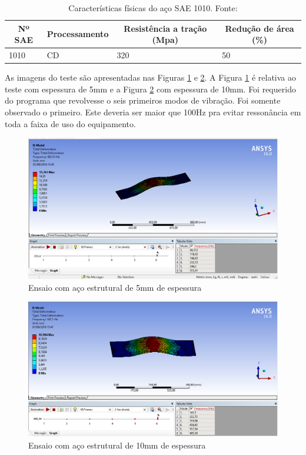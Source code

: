 \begin{table}[!h]
\centering
\caption{Características físicas do aço SAE 1010. Fonte: \cite{shigley}}
\label{tab:caracteristicas_aco}
\begin{tabular}{|l|l|l|l|}
\hline
\multicolumn{1}{|c|}{\textbf{Nº SAE}} & \multicolumn{1}{c|}{\textbf{Processamento}} & \multicolumn{1}{c|}{\textbf{Resistência a tração (Mpa)}} & \multicolumn{1}{c|}{\textbf{Redução de área (\%)}} \\ \hline
1010                                  & CD                                          & 320                                                      & 50                                                 \\ \hline
\end{tabular}
\end{table}

As imagens do teste são apresentadas nas Figuras \ref{fig:analise_1} e \ref{fig:analise_2}. A Figura \ref{fig:analise_1} é relativa ao teste 
com espessura de 5mm e a Figura \ref{fig:analise_2} com espessura de 10mm. Foi requerido do programa que revolvesse o seis primeiros modos de vibração.
Foi somente observado o primeiro. Este deveria ser maior que 100Hz pra evitar ressonância em toda a faixa de uso do equipamento.

\begin{figure}[!ht]
\centering
\includegraphics[scale=1]{figuras/analise_1.png}
\caption{Ensaio com aço estrutural de 5mm de espessura}
\label{fig:analise_1}
\end{figure}

\begin{figure}[!ht]
\centering
\includegraphics[scale=0.5]{figuras/analise_2.png}
\caption{Ensaio com aço estrutural de 10mm de espessura}
\label{fig:analise_2}
\end{figure}

